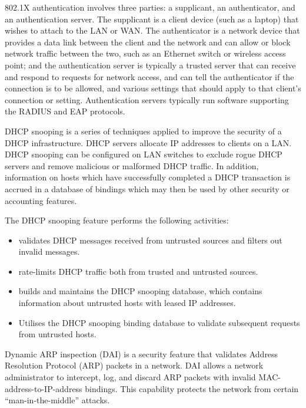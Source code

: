 {\begin{description}
   802.1X authentication involves three parties: a supplicant, an authenticator, and an authentication server.
   The supplicant is a client device (such as a laptop) that wishes to attach to the LAN or WAN.
   The authenticator is a network device that provides a data link between the client and the network and can allow or block network traffic between the two, such as an Ethernet switch or wireless access point; and the authentication server is typically a trusted server that can receive and respond to requests for network access, and can tell the authenticator if the connection is to be allowed, and various settings that should apply to that client's connection or setting.
   Authentication servers typically run software supporting the RADIUS and EAP protocols.
\item[DHCP snooping]
   DHCP snooping is a series of techniques applied to improve the security of a DHCP infrastructure.
   DHCP servers allocate IP addresses to clients on a LAN.
   DHCP snooping can be configured on LAN switches to exclude rogue DHCP servers and remove malicious or malformed DHCP traffic.
   In addition, information on hosts which have successfully completed a DHCP transaction is accrued in a database of bindings which may then be used by other security or accounting features.
   
   The DHCP snooping feature performs the following activities:
   \begin{itemize}
   \item validates DHCP messages received from untrusted sources and filters out invalid messages.
   \item rate-limits DHCP traffic both from trusted and untrusted sources.
   \item builds and maintains the DHCP snooping database, which contains information about untrusted hosts with leased IP addresses.
   \item Utilises the DHCP snooping binding database to validate subsequent requests from untrusted hosts.
   \end{itemize}
\item[dynamic ARP inspecition]
   Dynamic ARP inspection (DAI) is a security feature that validates Address Resolution Protocol (ARP) packets in a network.
   DAI allows a network administrator to intercept, log, and discard ARP packets with invalid MAC-address-to-IP-address bindings.
   This capability protects the network from certain ``man-in-the-middle'' attacks.
\end{description}
}

